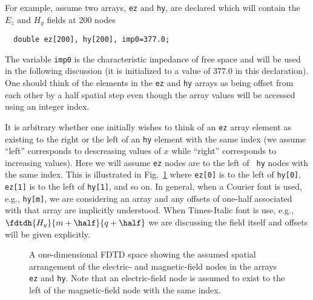 For example, assume two arrays, {\tt ez} and {\tt hy}, are
declared which will contain the $E_z$ and $H_y$ fields at 200 nodes
\begin{verbatim}
  double ez[200], hy[200], imp0=377.0;
\end{verbatim}
The variable {\tt imp0} is the characteristic impedance of free space
and will be used in the following discussion (it is initialized to a
value of $377.0$ in this declaration).  One should think of the
elements in the {\tt ez} and {\tt hy} arrays as being offset from
each other by a half spatial step even though the array values will be
accessed using an integer index.  

It is arbitrary whether one initially wishes to think of an {\tt ez}
array element as existing to the right or the left of an {\tt hy}
element with the same index (we assume ``left'' corresponds to
descreasing values of $x$ while ``right'' corresponds to increasing
values).  Here we will assume {\tt ez} nodes are to the left of {\tt
  hy} nodes with the same index.  This is illustrated in Fig.\
\ref{fig:oneDArrays} where {\tt ez[0]} is to the left of {\tt hy[0]},
{\tt ez[1]} is to the left of {\tt hy[1]}, and so on.  In general,
when a Courier font is used, e.g., {\tt hy[m]}, we are considering an
array and any offsets of one-half associated with that array are
implicitly understood.  When Times-Italic font is use, e.g.,
$\fdtdh{H_y}{m+\half}{q+\half}$ we are discussing the field itself and
offsets will be given explicitly.
\begin{figure}
  \begin{center}
  \end{center}
  \caption{A one-dimensional FDTD space showing the assumed spatial
  arrangement of the electric- and magnetic-field nodes in the arrays
  {\tt ez} and {\tt hy}.  Note that an electric-field node is assumed
  to exist to the left of the magnetic-field node with the same
  index.}  \label{fig:oneDArrays}
\end{figure}


